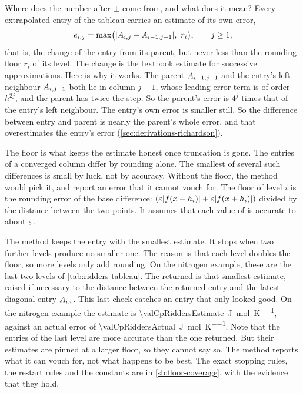 Where does the number after $\pm$ come from, and what does it mean? Every extrapolated entry of the tableau
carries an estimate of its own error,
\begin{equation}
  e_{i,j} = \max\bigl( \lvert A_{i,j} - A_{i-1,j-1} \rvert,\ r_i \bigr), \qquad j \ge 1,
  \label{eq:ridders-estimate}
\end{equation}
that is, the change of the entry from its parent, but never less than the rounding floor $r_i$ of its level. The
change is the textbook estimate for successive approximations. Here is why it works. The parent $A_{i-1,j-1}$ and
the entry's left neighbour $A_{i,j-1}$ both lie in column $j - 1$, whose leading error term is of order $h^{2j}$,
and the parent has twice the step. So the parent's error is $4^j$ times that of the entry's left neighbour. The
entry's own error is smaller still. So the difference between entry and parent is nearly the parent's whole error,
and that overestimates the entry's error (\cref{sec:derivations-richardson}).

The floor is what keeps the estimate honest once truncation is gone. The entries of a converged column differ by
rounding alone. The smallest of several such differences is small by luck, not by accuracy. Without the floor, the
method would pick it, and report an error that it cannot vouch for. The floor of level $i$ is the rounding error of
the base difference: $(\varepsilon \lvert f(x - h_i) \rvert + \varepsilon \lvert f(x + h_i) \rvert)$ divided by the distance between the
two points. It assumes that each value of  is accurate to about $\varepsilon$.

The method keeps the entry with the smallest estimate. It stops when two further levels produce no smaller one. The
reason is that each level doubles the floor, so more levels only add rounding. On the nitrogen example, these are the
last two levels of \cref{tab:ridders-tableau}. The returned  is that smallest estimate, raised if
necessary to the distance between the returned entry and the latest diagonal entry $A_{i,i}$. This last check
catches an entry that only looked good. On the nitrogen example the estimate is
\SI{\valCpRiddersEstimate}{\joule\per\mole\per\kelvin}, against an actual error of
\SI{\valCpRiddersActual}{\joule\per\mole\per\kelvin}. Note that the entries of the last level are more accurate than
the one returned. But their estimates are pinned at a larger floor, so they cannot say so. The method reports what it
can vouch for, not what happens to be best. The exact stopping rules, the restart rules and the constants are in
\cref{sb:floor-coverage}, with the evidence that they hold.


